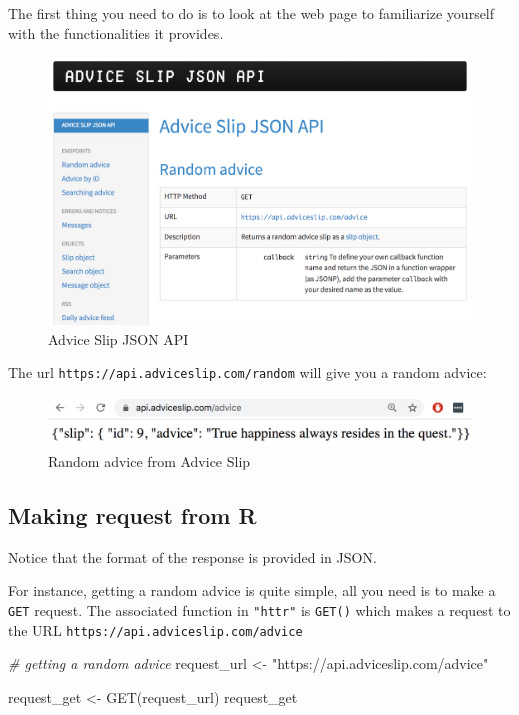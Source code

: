 \documentclass[
]{book}
\newenvironment{Shaded}{\begin{snugshade}}{\end{snugshade}}
\newcommand{\CommentTok}[1]{\textcolor[rgb]{0.56,0.35,0.01}{\textit{#1}}}
\newcommand{\FunctionTok}[1]{\textcolor[rgb]{0.00,0.00,0.00}{#1}}
\newcommand{\NormalTok}[1]{#1}
\newcommand{\OtherTok}[1]{\textcolor[rgb]{0.56,0.35,0.01}{#1}}
\newcommand{\StringTok}[1]{\textcolor[rgb]{0.31,0.60,0.02}{#1}}
\begin{document}
The first thing you need to do is to look at the web page to familiarize
yourself with the functionalities it provides.

\begin{figure}

{\centering \includegraphics[width=0.7\linewidth]{images/api/advice-slip} 

}

\caption{Advice Slip JSON API}\label{fig:unnamed-chunk-113}
\end{figure}

The url \texttt{https://api.adviceslip.com/random} will give you a random advice:

\begin{figure}

{\centering \includegraphics[width=0.7\linewidth]{images/api/advice-slip-happiness} 

}

\caption{Random advice from Advice Slip}\label{fig:unnamed-chunk-114}
\end{figure}

\hypertarget{making-request-from-r}{%
\subsection{Making request from R}\label{making-request-from-r}}

Notice that the format of the response is provided in JSON.

For instance, getting a random advice is quite simple, all you need is to make
a \texttt{GET} request. The associated function in \texttt{"httr"} is \texttt{GET()} which makes a
request to the URL \texttt{https://api.adviceslip.com/advice}

\begin{Shaded}
\begin{Highlighting}[]
\CommentTok{\# getting a random advice}
\NormalTok{request\_url }\OtherTok{\textless{}{-}} \StringTok{"https://api.adviceslip.com/advice"}

\NormalTok{request\_get }\OtherTok{\textless{}{-}} \FunctionTok{GET}\NormalTok{(request\_url)}
\NormalTok{request\_get}
\end{Highlighting}
\end{Shaded}
\end{document}

